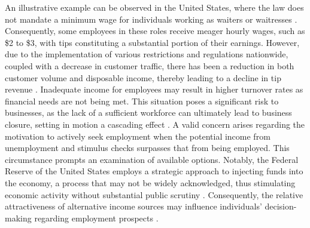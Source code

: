An illustrative example can be observed in the United States, where the law does not mandate a minimum wage for individuals working as waiters
or waitresses \cite{dol}. Consequently, some employees in these roles receive meager hourly wages, such as \$2 to \$3, with tips constituting
a substantial portion of their earnings. However, due to the implementation of various restrictions and regulations nationwide, coupled with a
decrease in customer traffic, there has been a reduction in both customer volume and disposable income, thereby leading to a decline in tip
revenue \cite{bls2022}. Inadequate income for employees may result in higher turnover rates as financial needs are not being met. This situation
poses a significant risk to businesses, as the lack of a sufficient workforce can ultimately lead to business closure, setting in motion a
cascading effect \cite{azar2020}. A valid concern arises regarding the motivation to actively seek employment when the potential income from
unemployment and stimulus checks surpasses that from being employed. This circumstance prompts an examination of available options. Notably,
the Federal Reserve of the United States employs a strategic approach to injecting funds into the economy, a process that may not be widely
acknowledged, thus stimulating economic activity without substantial public scrutiny \cite{frb}. Consequently, the relative attractiveness of
alternative income sources may influence individuals' decision-making regarding employment prospects \cite{cbo2021}.

